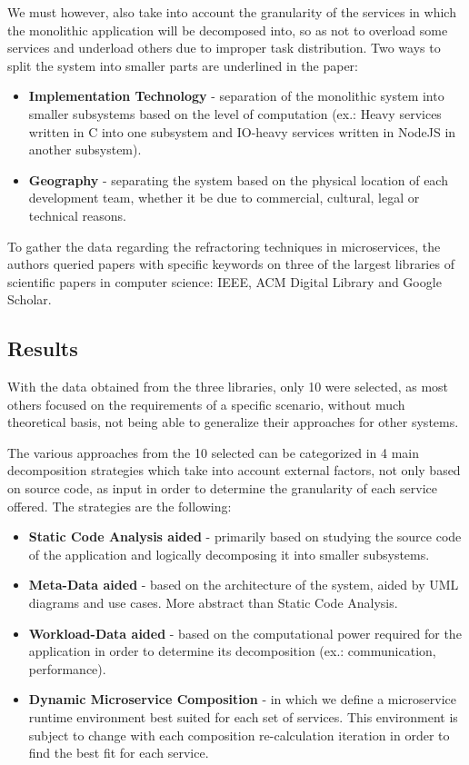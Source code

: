 \documentclass[14pt]{extarticle}
\begin{document}
We must however, also take into account the granularity of the services in which the monolithic application will be decomposed into, so as not to overload some services and underload others due to improper task distribution. Two ways to split the system into smaller parts are underlined in the paper:
\begin{itemize}
	\item \textbf{Implementation Technology} - separation of the monolithic system into smaller subsystems based on the level of computation (ex.: Heavy services written in C into one subsystem and IO-heavy services written in NodeJS in another subsystem).
	\item \textbf{Geography} - separating the system based on the physical location of each development team, whether it be due to commercial, cultural, legal or technical reasons.
\end{itemize}

To gather the data regarding the refractoring techniques in microservices, the authors queried papers with specific keywords on three of the largest libraries of scientific papers in computer science: IEEE, ACM Digital Library and Google Scholar.

\subsection{Results}
With the data obtained from the three libraries, only 10 were selected, as most others focused on the requirements of a specific scenario, without much theoretical basis, not being able to generalize their approaches for other systems.

The various approaches from the 10 selected can be categorized in 4 main decomposition strategies which take into account external factors, not only based on source code, as input in order to determine the granularity of each service offered. The strategies are the following:
\begin{itemize}
	\item \textbf{Static Code Analysis aided} - primarily based on studying the source code of the application and logically decomposing it into smaller subsystems.
	\item \textbf{Meta-Data aided} - based on the architecture of the system, aided by UML diagrams and use cases. More abstract than Static Code Analysis.
	\item \textbf{Workload-Data aided} - based on the computational power required for the application in order to determine its decomposition (ex.: communication, performance).
	\item \textbf{Dynamic Microservice Composition} - in which we define a microservice runtime environment best suited for each set of services. This environment is subject to change with each composition re-calculation iteration in order to find the best fit for each service.
\end{itemize}
\end{document}
